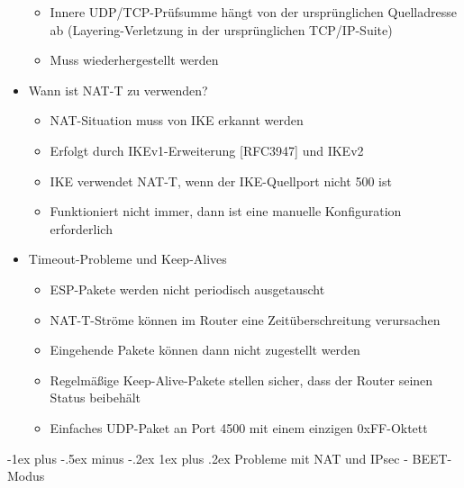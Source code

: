 \documentclass[a4paper]{article}
\makeatletter
\renewcommand{\subsubsection}{\@startsection{subsubsection}{3}{0mm}%
 {-1ex plus -.5ex minus -.2ex}%
 {1ex plus .2ex}%
 {\normalfont\small\bfseries}}
\makeatother
\begin{document}
\begin{multicols}{3}
\begin{itemize}
              \begin{itemize}
                  \item
                        Innere UDP/TCP-Prüfsumme hängt von der ursprünglichen Quelladresse
                        ab (Layering-Verletzung in der ursprünglichen TCP/IP-Suite)
                  \item
                        Muss wiederhergestellt werden
              \end{itemize}
        \item
              Wann ist NAT-T zu verwenden?

              \begin{itemize}
                  \item
                        NAT-Situation muss von IKE erkannt werden
                  \item
                        Erfolgt durch IKEv1-Erweiterung {[}RFC3947{]} und IKEv2
                  \item
                        IKE verwendet NAT-T, wenn der IKE-Quellport nicht 500 ist
                  \item
                        Funktioniert nicht immer, dann ist eine manuelle Konfiguration
                        erforderlich
              \end{itemize}
        \item
              Timeout-Probleme und Keep-Alives

              \begin{itemize}
                  \item
                        ESP-Pakete werden nicht periodisch ausgetauscht
                  \item
                        NAT-T-Ströme können im Router eine Zeitüberschreitung verursachen
                  \item
                        Eingehende Pakete können dann nicht zugestellt werden
                  \item
                        Regelmäßige Keep-Alive-Pakete stellen sicher, dass der Router seinen
                        Status beibehält
                  \item
                        Einfaches UDP-Paket an Port 4500 mit einem einzigen 0xFF-Oktett
              \end{itemize}
    \end{itemize}


    \subsubsection{Probleme mit NAT und IPsec -
        BEET-Modus}


\end{multicols}
\end{document}
